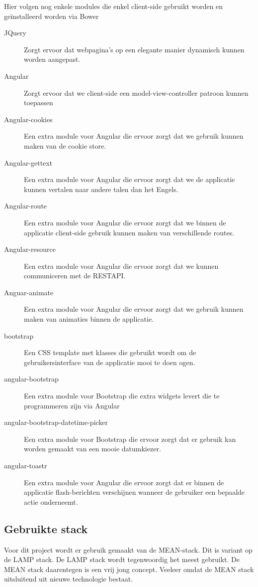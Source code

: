 \documentclass[a4paper,11pt]{article}
\begin{document}
Hier volgen nog enkele modules die enkel client-side gebruikt worden en geïnstalleerd worden via Bower
\begin{description}
\item[JQuery] Zorgt ervoor dat webpagina's op een elegante manier dynamisch kunnen worden aangepast.
\item[Angular] Zorgt ervoor dat we client-side een model-view-controller patroon kunnen toepassen
\item[Angular-cookies] Een extra module voor Angular die ervoor zorgt dat we gebruik kunnen maken van de cookie store.
\item[Angular-gettext] Een extra module voor Angular die ervoor zorgt dat we de applicatie kunnen vertalen naar andere talen dan het Engels.
\item[Angular-route] Een extra module voor Angular die ervoor zorgt dat we binnen de applicatie client-side gebruik kunnen maken van verschillende routes.
\item[Angular-resource] Een extra module voor Angular die ervoor zorgt dat we kunnen communiceren met de RESTAPI.
\item[Anguar-animate] Een extra module voor Angular die ervoor zorgt dat we gebruik kunnen maken van animaties binnen de applicatie.
\item[bootstrap] Een CSS template met klasses die gebruikt wordt om de gebruikersinterface van de applicatie mooi te doen ogen.
\item[angular-bootstrap] Een extra module voor Bootstrap die extra widgets levert die te programmeren zijn via Angular
\item[angular-bootstrap-datetime-picker] Een extra module voor Bootstrap die ervoor zorgt dat er gebruik kan worden gemaakt van een mooie datumkiezer.
\item[angular-toastr] Een extra module voor Angular die ervoor zorgt dat er binnen de applicatie flash-berichten verschijnen wanneer de gebruiker een bepaalde actie onderneemt.
\end{description}

\subsection{Gebruikte stack}
Voor dit project wordt er gebruik gemaakt van de MEAN-stack. Dit is variant op de LAMP stack. De LAMP stack wordt tegenwoordig het meest gebruikt. De MEAN stack daarentegen is een vrij jong concept. Veeleer omdat de MEAN stack uitsluitend uit nieuwe technologie bestaat.
\end{document}
